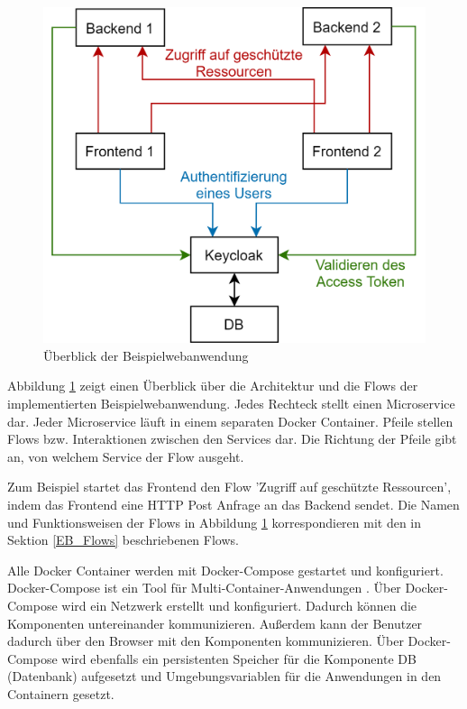 \begin{figure}[!ht]
	\centering
	\includegraphics[width=.8\textwidth]{Images/Ebert/ArchitectureDiagram.png}
	\caption{Überblick der Beispielwebanwendung}
	\label{fig:EB_Beispielwebanwendung Überblick}
\end{figure}

Abbildung \ref{fig:EB_Beispielwebanwendung Überblick} zeigt einen Überblick über die Architektur und die Flows der implementierten Beispielwebanwendung. Jedes Rechteck stellt einen Microservice dar. Jeder Microservice läuft in einem separaten Docker Container. Pfeile stellen Flows bzw. Interaktionen zwischen den Services dar. Die Richtung der Pfeile gibt an, von welchem Service der Flow ausgeht. 

Zum Beispiel startet das Frontend den Flow 'Zugriff auf geschützte Ressourcen', indem das Frontend eine HTTP Post Anfrage an das Backend sendet. Die Namen und Funktionsweisen der Flows in Abbildung \ref{fig:EB_Beispielwebanwendung Überblick} korrespondieren mit den in Sektion \ref{EB_Flows} beschriebenen Flows. 

Alle Docker Container werden mit Docker-Compose gestartet und konfiguriert. Docker-Compose ist ein Tool für Multi-Container-Anwendungen \cite{EB40}. Über Docker-Compose wird ein Netzwerk erstellt und konfiguriert. Dadurch können die Komponenten untereinander kommunizieren. Außerdem kann der Benutzer dadurch über den Browser mit den Komponenten kommunizieren. Über Docker-Compose wird ebenfalls ein persistenten Speicher für die Komponente DB (Datenbank) aufgesetzt und Umgebungsvariablen für die Anwendungen in den Containern gesetzt.

